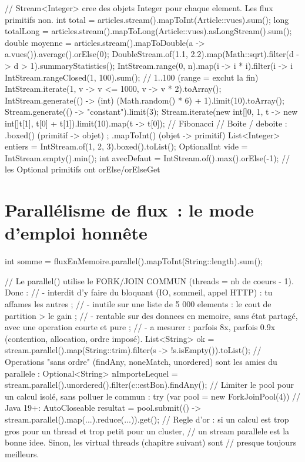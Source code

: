 \begin{codejava}
// Stream<Integer> cree des objets Integer pour chaque element. Les flux primitifs non.
int total = articles.stream().mapToInt(Article::vues).sum();
long totalLong = articles.stream().mapToLong(Article::vues).asLongStream().sum();
double moyenne = articles.stream().mapToDouble(a -> a.vues()).average().orElse(0);
DoubleStream.of(1.1, 2.2).map(Math::sqrt).filter(d -> d > 1).summaryStatistics();
IntStream.range(0, n).map(i -> i * i).filter(i -> i %
IntStream.rangeClosed(1, 100).sum();                      // 1..100 (range = exclut la fin)
IntStream.iterate(1, v -> v <= 1000, v -> v * 2).toArray();
IntStream.generate(() -> (int) (Math.random() * 6) + 1).limit(10).toArray();
Stream.generate(() -> "constant").limit(3);
Stream.iterate(new int[]{0, 1}, t -> new int[]{t[1], t[0] + t[1]}).limit(10).map(t -> t[0]);  // Fibonacci
// Boite / deboite : .boxed() (primitif -> objet) ; .mapToInt() (objet -> primitif)
List<Integer> entiers = IntStream.of(1, 2, 3).boxed().toList();
OptionalInt vide = IntStream.empty().min();
int avecDefaut = IntStream.of().max().orElse(-1);        // les Optional primitifs ont orElse/orElseGet
\end{codejava}

\section{Parall\'elisme de flux~: le mode d'emploi honn\^ete}

\begin{codejava}
int somme = fluxEnMemoire.parallel().mapToInt(String::length).sum();

// Le parallel() utilise le FORK/JOIN COMMUN (threads = nb de coeurs - 1). Donc :
//  - interdit d'y faire du bloquant (IO, sommeil, appel HTTP) : tu affames les autres ;
//  - inutile sur une liste de 5 000 elements : le cout de partition > le gain ;
//  - rentable sur des donnees en memoire, sans \'etat partag\'e, avec une operation courte et pure ;
//  - a mesurer : parfois 8x, parfois 0.9x (contention, allocation, ordre impos\'e).
List<String> ok = stream.parallel().map(String::trim).filter(s -> !s.isEmpty()).toList();
// Operations "sans ordre" (findAny, noneMatch, unordered) sont les amies du parallele :
Optional<String> nImporteLequel = stream.parallel().unordered().filter(c::estBon).findAny();
// Limiter le pool pour un calcul isol\'e, sans polluer le commun :
try (var pool = new ForkJoinPool(4)) {                  // Java 19+: AutoCloseable
    resultat = pool.submit(() -> stream.parallel().map(...).reduce(...)).get();
}
// Regle d'or : si un calcul est trop gros pour un thread et trop petit pour un cluster,
// un stream parallele est la bonne idee. Sinon, les virtual threads (chapitre suivant) sont
// presque toujours meilleurs.
\end{codejava}

